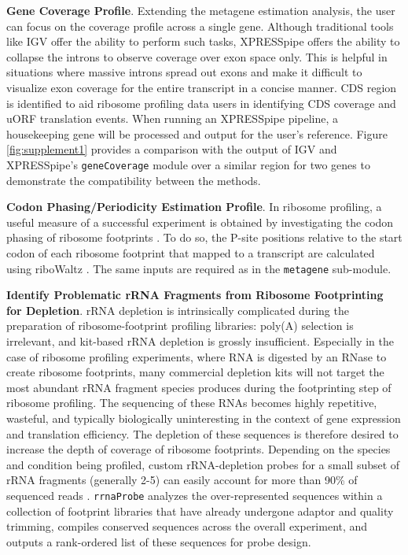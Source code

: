 \documentclass[10pt, oneside]{article}
\begin{document}
\noindent\textbf{Gene Coverage Profile}. Extending the metagene estimation analysis, the user can focus on the coverage profile across a single gene. Although traditional tools like IGV \cite{igv} offer the ability to perform such tasks, XPRESSpipe offers the ability to collapse the introns to observe coverage over exon space only. This is helpful in situations where massive introns spread out exons and make it difficult to visualize exon coverage for the entire transcript in a concise manner. CDS region is identified to aid ribosome profiling data users in identifying CDS coverage and uORF translation events. When running an XPRESSpipe pipeline, a housekeeping gene will be processed and output for the user's reference. Figure \ref{fig:supplement1} provides a comparison with the output of IGV \cite{igv} and XPRESSpipe's \texttt{geneCoverage} module over a similar region for two genes to demonstrate the compatibility between the methods. \par

\noindent\textbf{Codon Phasing/Periodicity Estimation Profile}. In ribosome profiling, a useful measure of a successful experiment is obtained by investigating the codon phasing of ribosome footprints \cite{ingolia_meth}. To do so, the P-site positions relative to the start codon of each ribosome footprint that mapped to a transcript are calculated using riboWaltz \cite{ribowaltz}. The same inputs are required as in the \texttt{metagene} sub-module. \par

\noindent\textbf{Identify Problematic rRNA Fragments from Ribosome Footprinting for Depletion}. rRNA depletion is intrinsically complicated during the preparation of ribosome-footprint profiling libraries: poly(A) selection is irrelevant, and kit-based rRNA depletion is grossly insufficient. Especially in the case of ribosome profiling experiments, where RNA is digested by an RNase to create ribosome footprints, many commercial depletion kits will not target the most abundant rRNA fragment species produces during the footprinting step of ribosome profiling. The sequencing of these RNAs becomes highly repetitive, wasteful, and typically biologically uninteresting in the context of gene expression and translation efficiency. The depletion of these sequences is therefore desired to increase the depth of coverage of ribosome footprints. Depending on the species and condition being profiled, custom rRNA-depletion probes for a small subset of rRNA fragments (generally 2-5) can easily account for more than 90\% of sequenced reads \cite{ingolia_meth, ingolia_science}. \texttt{rrnaProbe} analyzes the over-represented sequences within a collection of footprint libraries that have already undergone adaptor and quality trimming, compiles conserved sequences across the overall experiment, and outputs a rank-ordered list of these sequences for probe design. \\
\end{document}
